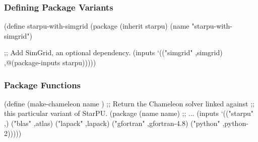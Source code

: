 \documentclass{beamer}
\begin{document}
\begin{frame}[fragile]
  \frametitle{Defining Package Variants}
  
  \begin{semiverbatim}
\small{
(define starpu-with-simgrid
  (package (\alert{inherit} starpu)
    (name "starpu-with-simgrid")

    ;; Add SimGrid, an optional dependency.
    (inputs `(("simgrid" ,simgrid)
              ,@(package-inputs starpu)))))
}
  \end{semiverbatim}
\end{frame}

\begin{frame}[fragile]
  \frametitle{Package Functions}

  \begin{semiverbatim}
\small{
  (define (\alert{make-chameleon} name )
     ;; Return the Chameleon solver linked against
     ;; this particular variant of StarPU.
     (\alert{package}
       (name name)
       ;; \textrm{...}
       (inputs `(("starpu" ,)
                 ("blas" ,atlas)
                 ("lapack" ,lapack)
                 ("gfortran" ,gfortran-4.8)
                 ("python" ,python-2)))))
}
  \end{semiverbatim}

\end{frame}

\begin{frame}[plain]
\end{frame}
\end{document}
